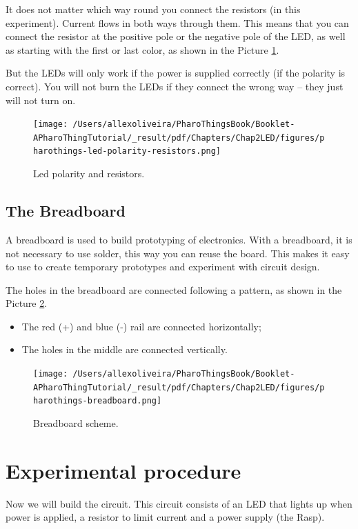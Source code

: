 \documentclass[10pt,twoside,english]{_support/latex/sbabook/sbabook}
\begin{document}
It does not matter which way round you connect the resistors (in this experiment). Current flows in both ways through them. This means that you can connect the resistor at the positive pole or the negative pole of the LED, as well as starting with the first or last color, as shown in the Picture \ref{Ledpolarity}.

But the LEDs will only work if the power is supplied correctly (if the polarity is correct). You will not burn the LEDs if they connect the wrong way – they just will not turn on.


\begin{figure}

\begin{center}
\texttt{[image: /Users/allexoliveira/PharoThingsBook/Booklet-APharoThingTutorial/\_result/pdf/Chapters/Chap2LED/figures/pharothings-led-polarity-resistors.png]}\caption{Led polarity and resistors.\label{Ledpolarity}}\end{center}
\end{figure}

\subsection{The Breadboard}
A breadboard is used to build prototyping of electronics. With a breadboard, it is not necessary to use solder, this way you can reuse the board. This makes it easy to use to create temporary prototypes and experiment with circuit design.

The holes in the breadboard are connected following a pattern, as shown in the Picture \ref{Breadboard}.

\begin{itemize}
\item The red (+) and blue (-) rail are connected horizontally;
\item The holes in the middle are connected vertically.
\end{itemize}


\begin{figure}

\begin{center}
\texttt{[image: /Users/allexoliveira/PharoThingsBook/Booklet-APharoThingTutorial/\_result/pdf/Chapters/Chap2LED/figures/pharothings-breadboard.png]}\caption{Breadboard scheme.\label{Breadboard}}\end{center}
\end{figure}

\section{Experimental procedure}
Now we will build the circuit. This circuit consists of an LED that lights up when power is applied, a resistor to limit current and a power supply (the Rasp).
\end{document}
